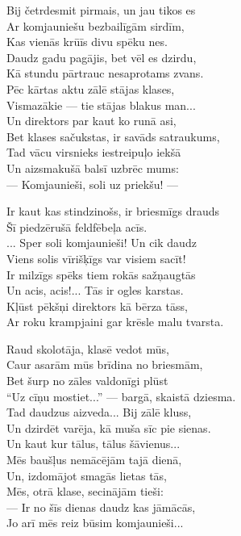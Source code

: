 \documentclass[14pt]{extarticle}
\begin{document}
{{Bij četrdesmit pirmais, un jau tikos es\\
Ar komjauniešu bezbailīgām sirdīm,\\
Kas vienās krūīs divu spēku nes.\\
Daudz gadu pagājis, bet vēl es dzirdu,\\
Kā stundu pārtrauc nesaprotams zvans.\\
Pēc kārtas  aktu zālē stājas klases,\\
Vismazākie --- tie stājas blakus man...\\
Un direktors par kaut ko runā asi,\\
Bet klases sačukstas, ir savāds satraukums,\\
Tad vācu virsnieks iestreipuļo iekšā\\
Un aizsmakušā balsī uzbrēc mums:\\
--- Komjaunieši, soli uz priekšu! ---

Ir kaut kas stindzinošs, ir briesmīgs drauds\\
Šī piedzērušā feldfēbeļa acīs.\\
... Sper soli komjaunieši! Un cik daudz\\
Viens solis vīrišķīgs var visiem sacīt!\\
Ir milzīgs spēks tiem rokās sažņaugtās\\
Un acis, acis!... Tās ir ogles karstas.\\
Kļūst pēkšņi direktors kā bērza tāss,\\
Ar roku krampjaini gar krēsle malu tvarsta. 

Raud skolotāja, klasē vedot mūs,\\
Caur asarām mūs brīdina no briesmām,\\
Bet šurp no zāles valdonīgi plūst\\
``Uz cīņu mostiet...'' --- bargā, skaistā dziesma.\\
Tad daudzus aizveda... Bij zālē kluss,\\
Un dzirdēt varēja, kā muša sīc pie sienas.\\
Un kaut kur tālus, tālus šāvienus...\\
Mēs baušļus nemācējām tajā dienā,\\
Un, izdomājot smagās lietas tās,\\
Mēs, otrā klase, secinājām tieši:\\
--- Ir no šīs dienas daudz kas jāmācās,\\
Jo arī mēs reiz būsim komjaunieši...

\newpage

}}
\end{document}
